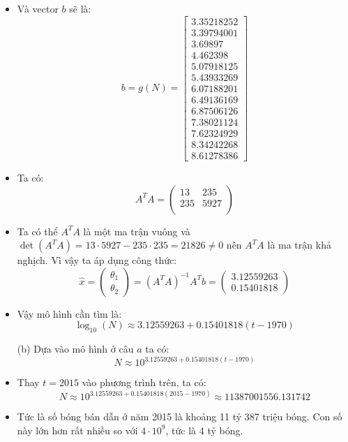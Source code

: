 \documentclass[a4paper, 12pt]{report}
\begin{document}
\begin{itemize}
    \item Và vector $b$ sẽ là:
    $$
    b = g(N) = \begin{bmatrix}
        3.35218252 \\ 3.39794001 \\ 3.69897 \\ 4.462398 \\ 5.07918125 \\
        5.43933269 \\ 6.07188201 \\ 6.49136169 \\ 6.87506126 \\ 7.38021124 \\
        7.62324929 \\ 8.34242268 \\ 8.61278386
    \end{bmatrix}
    $$

    \item Ta có:
    $$
    A^T A = \begin{pmatrix}
        13 & 235 \\
        235 & 5927 \\
    \end{pmatrix}
    $$

    \item Ta có thể $A^TA$ là một ma trận vuông và $\det(A^TA) = 13 \cdot 5927 - 235 \cdot 235 = 21826 \neq 0$ nên $A^TA$ là ma trận khả nghịch. Vì vậy ta áp dụng công thức:
    $$
    \hat{x} = \begin{pmatrix}
        \theta_1 \\
        \theta_2
    \end{pmatrix} = (A^TA)^{-1}A^Tb = 
    \begin{pmatrix}
        3.12559263 \\ 0.15401818
    \end{pmatrix}
    $$

    \item Vậy mô hình cần tìm là:
    $$
    \log_{10}(N) \approx 3.12559263 + 0.15401818(t - 1970)
    $$

    \item[(b)] Dựa vào mô hình ở câu $a$ ta có:
    $$
    N \approx 10^{3.12559263 + 0.15401818(t - 1970)}
    $$

    \item Thay $t = 2015$ vào phương trình trên, ta có:
    $$
    N \approx 10^{3.12559263 + 0.15401818(2015 - 1970)} \approx 11387001556.131742
    $$

    \item Tức là số bóng bán dẫn ở năm 2015 là khoảng 11 tỷ 387 triệu bóng. Con số này lớn hơn rất nhiều so với $4 \cdot 10^9$, tức là 4 tỷ bóng.
\end{itemize}
\end{document}
